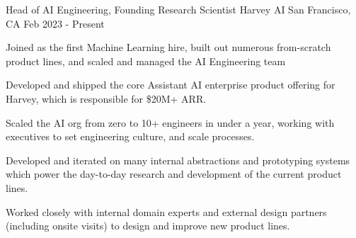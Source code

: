 
\begin{cventries}

  \cventry
  {Head of AI Engineering, Founding Research Scientist}
  {Harvey AI}
  {San Francisco, CA}
  {Feb 2023 - Present}
  {
    \begin{cvitems}
      \item Joined as the first Machine Learning hire, built out numerous from-scratch product lines, and scaled and managed the AI Engineering team
      \item Developed and shipped the core Assistant AI enterprise product offering for Harvey, which is responsible for \$20M+ ARR.
      \item Scaled the AI org from zero to 10+ engineers in under a year, working with executives to set engineering culture, and scale processes.
      \item Developed and iterated on many internal abstractions and prototyping systems which power the day-to-day research
      and development of the current product lines.
      \item Worked closely with internal domain experts and external design partners (including onsite visits) to design and
      improve new product lines.
    \end{cvitems}
  }


\end{cventries}

